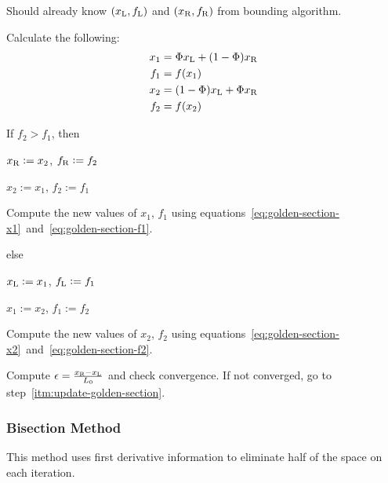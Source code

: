 \documentclass{article}
\begin{document}
\begin{enumerate*}
\setcounter{enumi}{-1}
\item Should already know \((x_{\mathrm{L}}, f_{\mathrm{L}})\) and \((x_{\mathrm{R}}, f_{\mathrm{R}})\) from bounding
  algorithm.
\item Calculate the following:
  \begin{align}
    x_1 &= \Phi x_{\mathrm{L}} + (1-\Phi) x_{\mathrm{R}} \label{eq:golden-section-x1} \\
    f_1 &= f(x_1) \label{eq:golden-section-f1} \\
    x_2 &= (1-\Phi) x_{\mathrm{L}} + \Phi x_{\mathrm{R}} \label{eq:golden-section-x2} \\
    f_2 &= f(x_2) \label{eq:golden-section-f2}
  \end{align}
\item \label{itm:update-golden-section} If \(f_2 > f_1\), then
  \begin{itemize*}
  \item \(x_{\mathrm{R}} := x_2\), \(f_{\mathrm{R}} := f_2\)
  \item \(x_2 := x_1\), \(f_2 := f_1\)
  \item Compute the new values of \(x_1\), \(f_1\) using
    equations~\ref{eq:golden-section-x1}~and~\ref{eq:golden-section-f1}.
  \end{itemize*}
  else
  \begin{itemize*}
  \item \(x_{\mathrm{L}} := x_1\), \(f_{\mathrm{L}} := f_1\)
  \item \(x_1 := x_2\), \(f_1 := f_2\)
  \item Compute the new values of \(x_2\), \(f_2\) using
    equations~\ref{eq:golden-section-x2}~and~\ref{eq:golden-section-f2}.
  \end{itemize*}
\item Compute \(\epsilon = \frac{x_{\mathrm{R}} - x_{\mathrm{L}}}{L_0}\) and check convergence. If not
  converged, go to step~\ref{itm:update-golden-section}.
\end{enumerate*}

\subsubsection{Bisection Method}\label{sec:bisection-region}

This method uses first derivative information to eliminate half of the space on each iteration.
\end{document}
